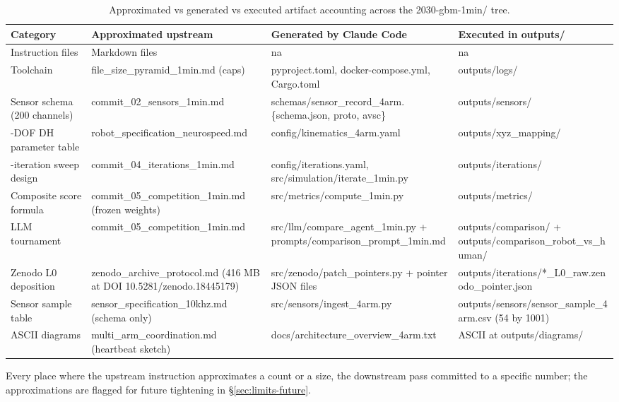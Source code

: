 \begin{table}[H]
\centering
\caption{Approximated vs generated vs executed artifact accounting
across the 2030-gbm-1min/ tree.}
\label{tab:accounting}
\begin{tabular}{>{\raggedright\arraybackslash}p{3.0cm}
                >{\raggedright\arraybackslash}p{4.0cm}
                >{\raggedright\arraybackslash}p{4.3cm}
                >{\raggedright\arraybackslash}p{3.5cm}}
\toprule
\textbf{Category} & \textbf{Approximated upstream} & \textbf{Generated by Claude Code} & \textbf{Executed in outputs/} \\
\midrule
Instruction files & 12 Markdown files & na & na \\
Toolchain & file_size_pyramid_1min.md (caps) & pyproject.toml, docker-compose.yml, Cargo.toml & outputs/logs/ \\
Sensor schema (200 channels) & commit_02_sensors_1min.md & schemas/sensor_record_4arm.\{schema.json, proto, avsc\} & outputs/sensors/ \\
7-DOF DH parameter table & robot_specification_neurospeed.md & config/kinematics_4arm.yaml & outputs/xyz_mapping/ \\
16-iteration sweep design & commit_04_iterations_1min.md & config/iterations.yaml, src/simulation/iterate_1min.py & outputs/iterations/ \\
Composite score formula & commit_05_competition_1min.md (frozen weights) & src/metrics/compute_1min.py & outputs/metrics/ \\
LLM tournament & commit_05_competition_1min.md & src/llm/compare_agent_1min.py + prompts/comparison_prompt_1min.md & outputs/comparison/ + outputs/comparison_robot_vs_human/ \\
Zenodo L0 deposition & zenodo_archive_protocol.md (416 MB at DOI 10.5281/zenodo.18445179) & src/zenodo/patch_pointers.py + pointer JSON files & outputs/iterations/*_L0_raw.zenodo_pointer.json \\
Sensor sample table & sensor_specification_10khz.md (schema only) & src/sensors/ingest_4arm.py & outputs/sensors/sensor_sample_4arm.csv (54 by 1001) \\
ASCII diagrams & multi_arm_coordination.md (heartbeat sketch) & docs/architecture_overview_4arm.txt & 6 ASCII at outputs/diagrams/ \\
\bottomrule
\end{tabular}
\end{table}

Every place where the upstream instruction approximates a count or a
size, the downstream pass committed to a specific number; the
approximations are flagged for future tightening in
\S\ref{sec:limits-future}.

